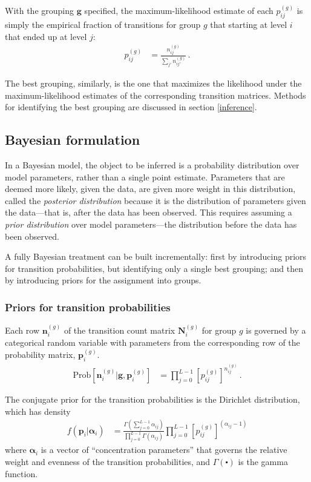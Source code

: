 \documentclass[12pt]{article}
\newcommand{\bg}{\mathbf{g}}
\newcommand{\bp}{\mathbf{p}}
\newcommand{\balpha}{\boldsymbol{\alpha}}
\newcommand{\bN}{\mathbf{N}}
\newcommand{\bn}{\mathbf{n}}
\newcommand{\Prob}{\mathrm{Prob}}
\begin{document}
With the grouping $\bg$ specified, the maximum-likelihood estimate of each $p_{ij}^{(g)}$ is simply the empirical fraction of transitions for group $g$ that starting at level $i$ that ended up at level $j$:
\begin{align}
	\hat{p}_{ij}^{(g)} &= \frac{n_{ij}^{(g)}}{\sum_{j'} n_{ij'}^{(g)}} \, .
\end{align}

The best grouping, similarly, is the one that maximizes the likelihood under the maximum-likelihood estimates of the corresponding transition matrices. Methods for identifying the best grouping are discussed in section \ref{inference}.

\subsection{Bayesian formulation}
\label{model-bayes}

In a Bayesian model, the object to be inferred is a probability distribution over model parameters, rather than a single point estimate. Parameters that are deemed more likely, given the data, are given more weight in this distribution, called the \emph{posterior distribution} because it is the distribution of parameters given the data---that is, after the data has been observed. This requires assuming a \emph{prior distribution} over model parameters---the distribution before the data has been observed.

A fully Bayesian treatment can be built incrementally: first by introducing priors for transition probabilities, but identifying only a single best grouping; and then by introducing priors for the assignment into groups.

\subsubsection{Priors for transition probabilities}
\label{model-prob-priors}

Each row $\bn_i^{(g)}$ of the transition count matrix $\bN_i^{(g)}$ for group $g$ is governed by a categorical random variable with parameters from the corresponding row of the probability matrix, $\bp_i^{(g)}$.
\begin{align}
	\Prob\left[\bn_i^{(g)} | \bg, \bp_i^{(g)}\right]
&= \prod_{j=0}^{L-1} \left[p_{ij}^{(g)}\right]^{n_{ij}^{(g)}} \, .
\end{align}

The conjugate prior for the transition probabilities is the Dirichlet distribution, which has density
\begin{align}
	f(\bp_i | \balpha_i) &=
		\frac{
			\Gamma \left( \sum_{j=0}^{L-1} \alpha_{ij} \right)
		}{
			\prod_{j=0}^{L-1} \Gamma(\alpha_{ij})
		}
		\prod_{j=0}^{L-1}  \left[p_{ij}^{(g)}\right]^{(\alpha_{ij} - 1)}
\end{align}
where $\balpha_i$ is a vector of ``concentration parameters'' that governs the relative weight and evenness of the transition probabilities, and $\Gamma(\centerdot)$ is the gamma function.
\end{document}
